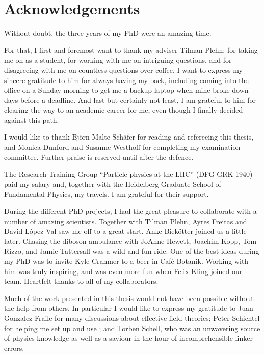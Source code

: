 
\chapter*{Acknowledgements}

Without doubt, the three years of my PhD were an amazing time.

For that, I first and foremost want to thank my adviser Tilman Plehn:
for taking me on as a student, for working with me on intriguing
questions, and for disagreeing with me on countless questions over
coffee. I want to express my sincere gratitude to him for always
having my back, including coming into the office on a Sunday morning
to get me a backup laptop when mine broke down days before a
deadline. And last but certainly not least, I am grateful to him for
clearing the way to an academic career for me, even though I finally
decided against this path.

I would like to thank Bj\"orn Malte Sch\"afer for reading and
refereeing this thesis, and Monica Dunford and Susanne Westhoff for
completing my examination committee. Further praise is reserved until
after the defence.

The Research Training Group ``Particle physics at the LHC'' (DFG GRK
1940) paid my salary and, together with the Heidelberg Graduate School
of Fundamental Physics, my travels. I am grateful for their support.

During the different PhD projects, I had the great pleasure to
collaborate with a number of amazing scientists. Together with Tilman
Plehn, Ayres Freitas and David L\'opez-Val saw me off to a great
start. Anke Biek\"otter joined us a little later. Chasing the diboson
ambulance with JoAnne Hewett, Joachim Kopp, Tom Rizzo, and Jamie
Tattersall was a wild and fun ride. One of the best ideas during my
PhD was to invite Kyle Cranmer to a beer in Caf\'e Botanik. Working
with him was truly inspiring, and was even more fun when Felix Kling
joined our team.  Heartfelt thanks to all of my collaborators.

Much of the work presented in this thesis would not have been possible
without the help from others. In particular I would like to express my
gratitude to Juan Gonzalez-Fraile for many discussions about effective
field theories; Peter Schichtel for helping me set up and use
; and Torben Schell, who was an unwavering source of
physics knowledge as well as a saviour in the hour of incomprehensible
linker errors.

